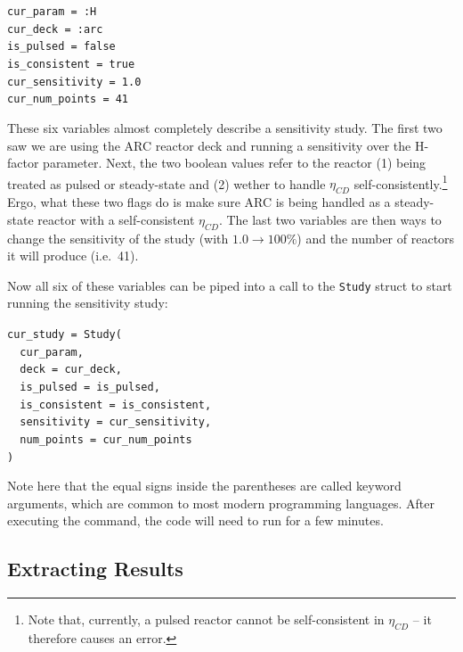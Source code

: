\begin{addmargin}[1.5em]{1.5em}
\texttt{cur\_param = :H \\
cur\_deck = :arc \\
is\_pulsed = false \\
is\_consistent = true \\
cur\_sensitivity = 1.0 \\
cur\_num\_points = 41
}
\end{addmargin}

These six variables almost completely describe a sensitivity study. The first two saw we are using the ARC reactor deck and running a sensitivity over the H-factor parameter. Next, the two boolean values refer to the reactor (1) being treated as pulsed or steady-state and (2) wether to handle $\eta_{CD}$ self-consistently.\footnote{Note that, currently, a pulsed reactor cannot be self-consistent in $\eta_{CD}$ -- it therefore causes an error.} Ergo, what these two flags do is make sure ARC is being handled as a steady-state reactor with a self-consistent $\eta_{CD}$. The last two variables are then ways to change the sensitivity of the study (with $1.0 \rightarrow 100\%$) and the number of reactors it will produce (i.e.\ 41).

Now all six of these variables can be piped into a call to the \texttt{Study} struct to start running the sensitivity study:

\begin{addmargin}[1.5em]{1.5em}
\texttt{cur\_study = Study( \\
\-\ \-\ cur\_param, \\
\-\ \-\ deck = cur\_deck, \\
\-\ \-\ is\_pulsed = is\_pulsed, \\
\-\ \-\ is\_consistent = is\_consistent, \\
\-\ \-\ sensitivity = cur\_sensitivity, \\
\-\ \-\ num\_points = cur\_num\_points \\
)
}
\end{addmargin}

Note here that the equal signs inside the parentheses are called keyword arguments, which are common to most modern programming languages. After executing the command, the code will need to run for a few minutes.

\subsection{Extracting Results}

